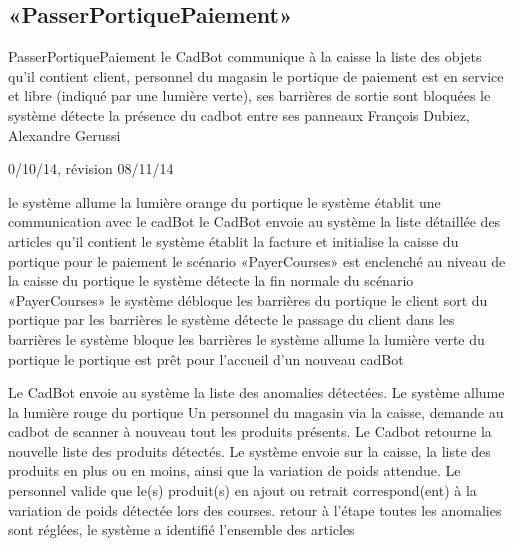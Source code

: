﻿%
\subsection{«PasserPortiquePaiement»}

\startCU
\nom PasserPortiquePaiement
\but le CadBot communique à la caisse la liste des objets qu'il contient
\acteur client, personnel du magasin
\precondition le portique de paiement est en service et libre (indiqué par une lumière verte), ses barrières de sortie sont bloquées
\declenchement le système détecte la présence du cadbot entre ses panneaux
\auteur François Dubiez, Alexandre Gerussi
\date 30/10/14, révision 08/11/14

\nominal %
\startnominal
\etape le système allume la lumière orange du portique
 le système établit une communication avec le cadBot
 le CadBot envoie au système la liste détaillée des articles qu'il contient
 le système établit la facture et initialise la caisse du portique pour le paiement
\etape le scénario «PayerCourses» est enclenché au niveau de la caisse du portique
\etape le système détecte la fin normale du scénario «PayerCourses»
\etape le système débloque les barrières du portique
\etape le client sort du portique par les barrières
 le système détecte le passage du client dans les barrières
 le système bloque les barrières
\etape le système allume la lumière verte du portique
\stopnominal
\postcondition le portique est prêt pour l'accueil d'un nouveau cadBot

\alternatifs %

  \etape Le CadBot envoie au système la liste des anomalies détectées.
  \etape Le système allume la lumière rouge du portique
  \etape Un personnel du magasin via la caisse, demande au cadbot de scanner à nouveau tout les produits présents.
  \etape Le Cadbot retourne la nouvelle liste des produits détectés.
  \etape Le système envoie sur la caisse, la liste des produits en plus ou en moins, ainsi que la variation de poids attendue.
   Le personnel valide que le(s) produit(s) en ajout ou retrait correspond(ent) à la variation de poids détectée lors des courses.
  \etape retour à l'étape 
\stopcondition
\postcondition toutes les anomalies sont réglées, le système a identifié l'ensemble des articles
\stopalternatif

